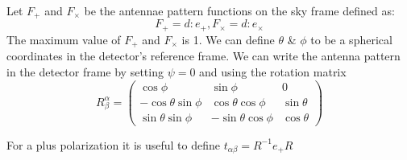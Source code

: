 \documentclass{ttuthes2007}
\begin{document}
Let $F_+$ and $F_\times$ be the antennae pattern functions on the sky frame
defined as:
\begin{equation}
F_+=d:e_+,  F_\times=d:e_\times
\end{equation}
The maximum value of $F_+$ and $F_\times$ is 1. We can define $\theta$ \&
$\phi$ to be a spherical coordinates in the detector's reference frame. We can write
the antenna pattern in the detector frame by setting $\psi=0$ and using the
rotation matrix
\begin{equation*}                                                               
R_\beta^\alpha=                                                                  
 \begin{pmatrix}                                                                
    \cos\phi & \sin\phi & 0 \\                                                            
    -\cos\theta \sin\phi & \cos\theta \cos\phi & \sin\theta \\                                                            
    \sin\theta \sin\phi & -\sin\theta \cos\phi & \cos\theta                                                              
 \end{pmatrix}                                                                  
\end{equation*}   

For a plus polarization it is useful to define $t_{\alpha\beta}= R^{-1}e_+R$
\end{document}
